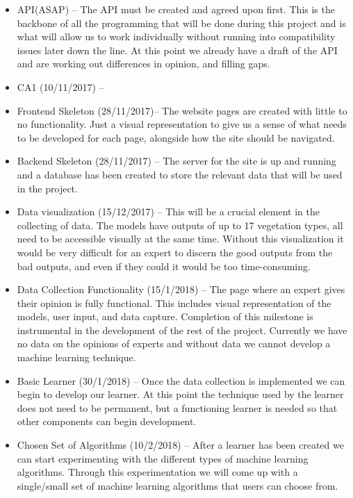 \documentclass{ecmm427_assignment}
\begin{document}
\begin{itemize}

\item API(ASAP) – The API must be created and agreed upon first. This is the backbone of all the programming that will be done during this project and is what will allow us to work individually without running into compatibility issues later down the line. At this point we already have a draft of the API and are working out differences in opinion, and filling gaps.

\item CA1 (10/11/2017) – 

\item Frontend Skeleton (28/11/2017)– The website pages are created with little to no functionality. Just a visual representation to give us a sense of what needs to be developed for each page, alongside how the site should be navigated.

\item Backend Skeleton (28/11/2017) –  The server for the site is up and running and a database has been created to store the relevant data that will be used in the project. 

\item Data visualization (15/12/2017) –  This will be a crucial element in the collecting of data. The models have outputs of up to 17 vegetation types, all need to be accessible visually at the same time. Without this visualization it would be very difficult for an expert to discern the good outputs from the bad outputs, and even if they could it would be too time-consuming.

\item Data Collection Functionality (15/1/2018) – The page where an expert gives their opinion is fully functional. This includes visual representation of the models, user input, and data capture. Completion of this milestone is instrumental in the development of the rest of the project. Currently we have no data on the opinions of experts and without data we cannot develop a machine learning technique.

\item Basic Learner (30/1/2018) – Once the data collection is implemented we can begin to develop our learner. At this point the technique used by the learner does not need to be permanent, but a functioning learner is needed so that other components can begin development.

\item Chosen Set of Algorithms (10/2/2018) – After a learner has been created we can start experimenting with the different types of machine learning algorithms. Through this experimentation we will come up with a single/small set of machine learning algorithms that users can choose from.


\end{itemize}
\end{document}
